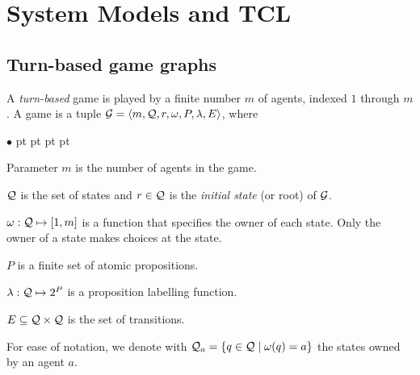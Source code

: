\documentclass{llncs}
\newcommand{\calg}{{\cal G}}
\newcommand{\calq}{{\cal Q}}
\newenvironment{list1}{\begin{list}{$\bullet$}
{\topsep 0 pt \parsep 0 pt \partopsep 0 pt \itemsep 0 pt}}{\end{list}}
\begin{document}
\section{System Models and TCL \label{sec.sysmodel}}

\subsection{Turn-based game graphs \label{subsec.tb.gg}} 

A {\em turn-based} game is played by a finite number $m$ of agents, indexed $1$ through $m$.
A game is a tuple $\calg=\langle m,\calq,r,\omega,P,\lambda,E\rangle$, where
\begin{list1}
\item 
	Parameter $m$ is the number of agents in the game.
\item 
	$\calq$ is the set of states and
	$r\in \calq$ is the {\em initial state} (or root) of $\calg$.
\item 
	$\omega:\calq\mapsto [1,m]$ is a function that specifies the
    owner of each state.
    Only the owner of a state makes choices at the state.
\item 
	$P$ is a finite set of atomic propositions.
\item 
	$\lambda:\calq\mapsto 2^P$ is a proposition labelling function.
\item 
	$E\subseteq \calq \times \calq$ is the set of transitions.
\end{list1}
For ease of notation, we denote with 
$\calq_a = \{q \in \calq \mid \omega(q)=a\}$ 
the states owned by an agent $a$.
\end{document}
